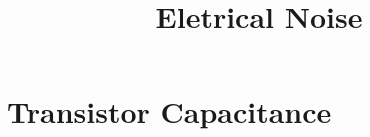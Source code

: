 \documentclass[•]{article}
\begin{document}
\title{Eletrical Noise}
\maketitle

\tableofcontents
\newpage

\section{Transistor Capacitance}
\end{document}
